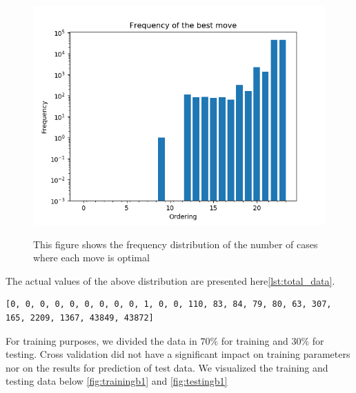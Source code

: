 \begin{figure}
\centering
\includegraphics[scale=0.75]{totalb1.png}\\
\caption{This figure shows the frequency distribution of the number of cases where each move is optimal}
\label{fig:totalb1}
\end{figure}

The actual values of the above distribution are presented here\ref{lst:total_data}.

\begin{lstlisting}[caption=Frequencies of optimal moves in total data, label={lst:total_data}]
[0, 0, 0, 0, 0, 0, 0, 0, 0, 1, 0, 0, 110, 83, 84, 79, 80, 63, 307, 165, 2209, 1367, 43849, 43872]
\end{lstlisting}

\par For training purposes, we divided the data in $70\%$ for training and $30\%$ for testing. Cross validation did not have a significant impact on training parameters nor on the results for prediction of test data. We visualized the training and testing data below \ref{fig:trainingb1} and \ref{fig:testingb1}

